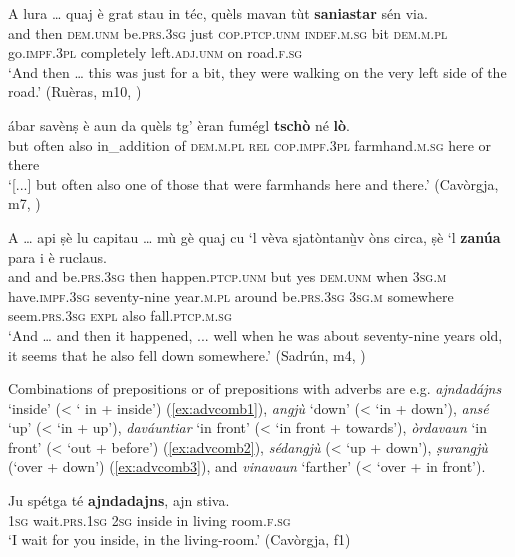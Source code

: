 \ea
\label{ex:san1}
\gll A lura … quaj è grat stau in téc, quèls mavan tùt \textbf{saniastar} sén via. \\
and then {} \textsc{dem.unm} be.\textsc{prs.3sg} just \textsc{cop.ptcp.unm} \textsc{indef.m.sg} bit \textsc{dem.m.pl} go.\textsc{impf.3pl} completely left.\textsc{adj.unm} on road.\textsc{f.sg}  \\
\glt `And then … this was just for a bit, they were walking on the very left side of the road.' (Ruèras, m10, )
\z

\ea
\label{ex:tscholo}
\gll [...] ábar savènṣ è aun da quèls tg’ èran fumégl \textbf{tschò} né \textbf{lò}.\\
{} but often also in\_addition of \textsc{dem.m.pl} \textsc{rel} \textsc{cop.impf.3pl} farmhand.\textsc{m.sg} here or there\\
\glt `[...] but often also one of those that were farmhands here and there.' (Cavòrgja, m7, )
\z

\ea
\label{ex:zan1}
\gll  A … api ṣè lu capitau … mù gè quaj cu `l vèva sjatòntanù̱v òns circa, ṣè `l \textbf{zanúa} para i è ruclaus.  \\
and {} and be.\textsc{prs.3sg} then happen.\textsc{ptcp.unm} {} but yes \textsc{dem.unm} when \textsc{3sg.m} have.\textsc{impf.3sg} seventy-nine year.\textsc{m.pl} around be.\textsc{prs.3sg} \textsc{3sg.m} somewhere  seem.\textsc{prs.3sg} \textsc{expl} also fall.\textsc{ptcp.m.sg}\\
\glt `And … and then it happened, ... well when he was about seventy-nine years old, it seems that he also fell down somewhere.' (Sadrún, m4, )
\z

Combinations of prepositions or of prepositions with adverbs are e.g. \textit{ajndadájns} `inside' (< ` in + inside') (\ref{ex:advcomb1}), \textit{angjù} `down' (< `in + down'), \textit{ansé} `up' (< `in + up'), \textit{daváuntiar} `in front' (< `in front + towards'), \textit{òrdavaun} `in front' (< `out + before') (\ref{ex:advcomb2}), \textit{sédangjù} (< `up + down'), \textit{ṣurangjù} (`over + down') (\ref{ex:advcomb3}),  and \textit{vinavaun} `farther' (< `over + in front').

\ea
\label{ex:advcomb1}
\gll Ju spétga té \textbf{ajndadajns}, ajn stiva.\\
\textsc{1sg} wait\textsc{.prs.1sg} \textsc{2sg} inside in living room.\textsc{f.sg}\\
\glt `I wait for you inside, in the living-room.' (Cavòrgja, f1)
\z

